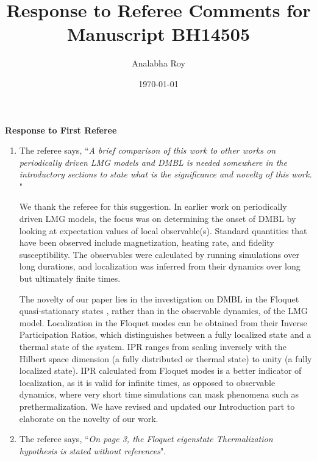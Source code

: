 \documentclass[aps,prb,reprint,showpacs,floatfix,superscriptaddress, onecolumn, nofootinbib, 9pt]{revtex4-2}
\newcommand{\response}[1]{{\color{black}#1}} %
\newcommand{\comment}[1]{{\color{blue}#1}} %
\begin{document}
	
	\title{Response to Referee Comments for Manuscript BH14505}
	\author{Analabha Roy}
	\date{\today}
	
	\maketitle
	
	\vspace{1em}
	
	\noindent \textbf{Response to First Referee}
	
	\begin{enumerate}
		\item The referee says, \comment{``\textit{A brief comparison of this work to other works on periodically driven LMG models and DMBL is needed somewhere in the introductory sections to state what is the significance and novelty of this work. }"}\\
		
		\response{
			We thank the referee for this suggestion. In earlier work on periodically driven LMG models,
			the focus was on determining the onset of DMBL by looking at expectation values of local
			observable(s). Standard quantities that have been observed include magnetization, heating rate, and fidelity susceptibility. The observables were calculated by running simulations over long durations, and localization was inferred from their dynamics over long but ultimately finite times.
			
			The novelty of our paper lies in the investigation on DMBL in the Floquet quasi-stationary states , rather than in the observable dynamics, of the LMG model. Localization in the Floquet modes can be obtained from their Inverse Participation Ratios, which distinguishes between a fully localized state and a thermal state of the system. IPR ranges from scaling inversely with the Hilbert space dimension (a fully distributed or thermal state) to unity (a fully localized state). IPR calculated from Floquet modes is a better indicator of localization, as it is valid for infinite times, as opposed to observable dynamics, where very short time simulations can mask phenomena such as prethermalization. We have revised and updated our Introduction part to elaborate on the novelty of our work.
		}
		
		\item The referee says, \comment{``\textit{On page 3, the Floquet eigenstate Thermalization hypothesis is stated without references}".}\\
		

\end{enumerate}
\end{document}
